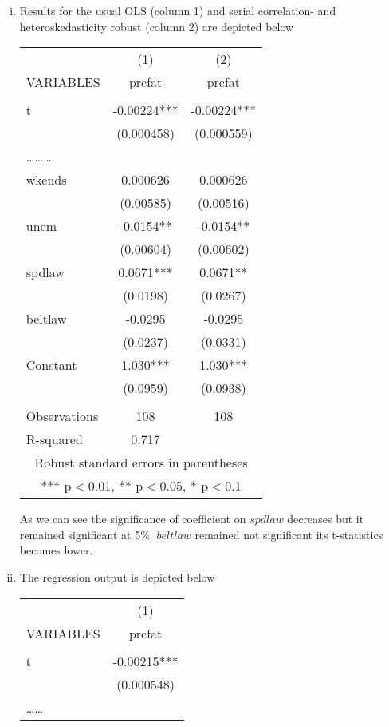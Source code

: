 \documentclass[a4paper]{article}
\begin{document}
\begin{enumerate}[(i)]
	\item Results for the usual OLS (column 1) and serial correlation- and heteroskedasticity robust (column 2) are depicted below
	\begin{center}
	\begin{tabular}{lcc} \hline
		& (1) & (2) \\
		VARIABLES & prcfat & prcfat \\ \hline
		&  &  \\
		t & -0.00224*** & -0.00224*** \\
		& (0.000458) & (0.000559) \\
		\dots \dots \dots\\
		wkends & 0.000626 & 0.000626 \\
		& (0.00585) & (0.00516) \\
		unem & -0.0154** & -0.0154** \\
		& (0.00604) & (0.00602) \\
		spdlaw & 0.0671*** & 0.0671** \\
		& (0.0198) & (0.0267) \\
		beltlaw & -0.0295 & -0.0295 \\
		& (0.0237) & (0.0331) \\
		Constant & 1.030*** & 1.030*** \\
		& (0.0959) & (0.0938) \\
		&  &  \\
		Observations & 108 & 108 \\
		R-squared & 0.717 &  \\ \hline
		\multicolumn{3}{c}{ Robust standard errors in parentheses} \\
		\multicolumn{3}{c}{ *** p$<$0.01, ** p$<$0.05, * p$<$0.1} \\
	\end{tabular}
	\end{center}
As we can see the significance of coefficient on $spdlaw$ decreases but it remained significant at 5\%. $beltlaw$ remained not significant its t-statistics becomes lower.
\item The regression output is depicted below
\begin{center}
	\begin{tabular}{lc} \hline
		& (1) \\
		VARIABLES & prcfat \\ \hline
		&  \\
		t & -0.00215*** \\
		& (0.000548) \\
		\dots \dots \\

\end{tabular}
\end{center}
\end{enumerate}
\end{document}
